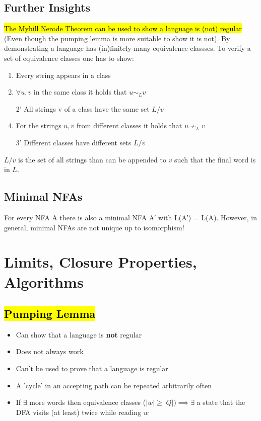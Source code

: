 \documentclass[a3paper, 8pt]{extarticle}
\begin{document}
\begin{multicols*}{6}
\subsection{Further Insights}
\hl{The Myhill Nerode Theorem can be used to show a language is (not) regular} (Even though the pumping lemma is more suitable to show it is not). By demonstrating a language has (in)finitely many equivalence classses. To verify a set of equivalence classes one has to show: \begin{enumerate}
    \item Every string appears in a class
    \item $\forall u,v$ in the same class it holds that $u \sim_L v$
    \item[2']  All strings v of a class have the same set $L/v$
    \item For the strings $u, v$ from different classes it holds that $u \nsim_L v$
    \item[3'] Different classes have different sets $L/v$
\end{enumerate}

$L/v$ is the set of all strings than can be appended to $v$ such that the final word is in $L$.
\subsection{Minimal NFAs}
For every NFA A there is also a minimal NFA A′ with L(A′) = L(A). However, in general, minimal NFAs are not unique up to isomorphism!
\section{Limits, Closure Properties, Algorithms} 
\subsection{\hl{Pumping Lemma}}
\begin{itemize}
    \item Can show that a language is \textbf{not} regular
    \item Does not always work
    \item Can't be used to prove that a language is regular
    \item A 'cycle' in an accepting path can be repeated arbitrarily often
    \item If $\exists$ more words then equivalence classes ($|w| \geq |Q|) \implies \exists$ a state that the DFA visits (at least) twice while reading $w$\end{itemize} 
   

\end{multicols*}
\end{document}
